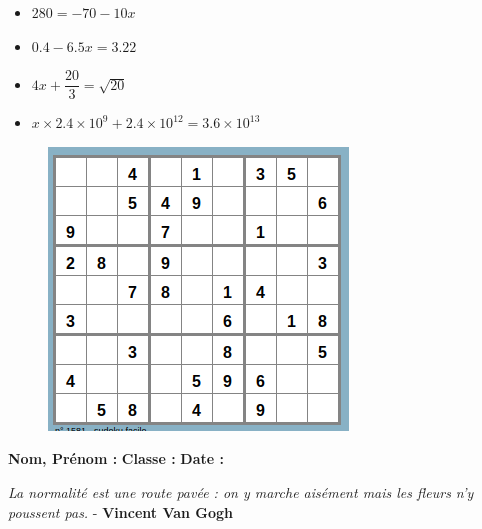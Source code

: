 \begin{multicols}{2}
  \begin{itemize}[label={$\bullet$}]
\item $280 = -70 - 10x$ \\ \Pointilles[10]  \columnbreak 
\item $0.4 - 6.5x = 3.22$ \\ \Pointilles[10]
\end{itemize} 
\end{multicols}

\begin{multicols}{2}
  \begin{itemize}[label={$\bullet$}]
\item $4x + \dfrac{20}{3} = \sqrt{20}$ \\ \Pointilles[10]  \columnbreak 
\item $x \times 2.4 \times 10^{9} +  2.4 \times 10^{12} = 3.6 \times 10^{13}$ \\ \Pointilles[10]
\end{itemize} 
\end{multicols}

\begin{figure}[H]
  \centering
  \includegraphics[width=0.6\linewidth]{4x6-equations/sudoku-9a.png}
\end{figure}

\newpage


\textbf{Nom, Prénom :} \hspace{8cm} \textbf{Classe :} \hspace{3cm} \textbf{Date :}\\
\vspace{-0.8cm}
\begin{center}
  \textit{La normalité est une route pavée : on y marche aisément mais les fleurs n’y poussent pas.} - \textbf{Vincent Van Gogh}
\end{center}
\vspace{-0.8cm}

